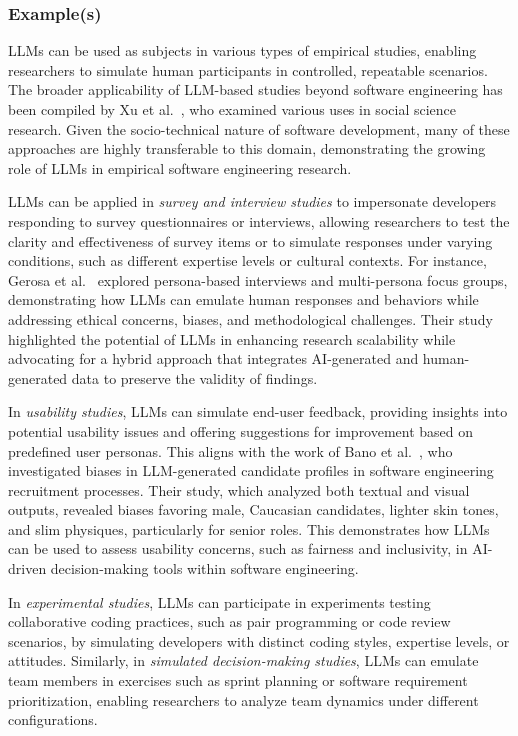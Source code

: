 \documentclass[11pt]{article}
\begin{document}
\subsubsection{Example(s)}

LLMs can be used as subjects in various types of empirical studies, enabling researchers to simulate human participants in controlled, repeatable scenarios. The broader applicability of LLM-based studies beyond software engineering has been compiled by Xu et al.~\cite{DBLP:journals/ipm/XuSRGPLSH24}, who examined various uses in social science research. Given the socio-technical nature of software development, many of these approaches are highly transferable to this domain, demonstrating the growing role of LLMs in empirical software engineering research.

LLMs can be applied in \textit{survey and interview studies} to impersonate developers responding to survey questionnaires or interviews, allowing researchers to test the clarity and effectiveness of survey items or to simulate responses under varying conditions, such as different expertise levels or cultural contexts. For instance, Gerosa et al.~\cite{DBLP:journals/ase/GerosaTSS24} explored persona-based interviews and multi-persona focus groups, demonstrating how LLMs can emulate human responses and behaviors while addressing ethical concerns, biases, and methodological challenges. Their study highlighted the potential of LLMs in enhancing research scalability while advocating for a hybrid approach that integrates AI-generated and human-generated data to preserve the validity of findings.

In \textit{usability studies}, LLMs can simulate end-user feedback, providing insights into potential usability issues and offering suggestions for improvement based on predefined user personas. This aligns with the work of Bano et al.~\cite{bano2025doessoftwareengineerlook}, who investigated biases in LLM-generated candidate profiles in software engineering recruitment processes. Their study, which analyzed both textual and visual outputs, revealed biases favoring male, Caucasian candidates, lighter skin tones, and slim physiques, particularly for senior roles. This demonstrates how LLMs can be used to assess usability concerns, such as fairness and inclusivity, in AI-driven decision-making tools within software engineering.

In \textit{experimental studies}, LLMs can participate in experiments testing collaborative coding practices, such as pair programming or code review scenarios, by simulating developers with distinct coding styles, expertise levels, or attitudes. 
Similarly, in \textit{simulated decision-making studies}, LLMs can emulate team members in exercises such as sprint planning or software requirement prioritization, enabling researchers to analyze team dynamics under different configurations.
\end{document}
